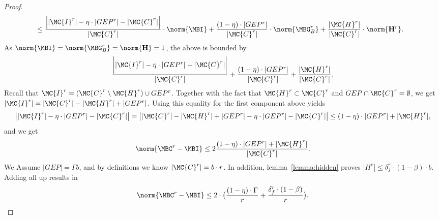 \begin{proof}
\begin{equation}
\begin{split}
& \leq \frac{\Big| |\MC{I}^r|-\eta\cdot |GEP^r|-|\MC{C}^r|\Big|}{|\MC{C}^r|}\cdot \norm{\MBI}+ \frac{(1-\eta)\cdot|GEP^r|}{|\MC{C}^r|}\cdot \norm{\MBG_B^r}+\frac{|\MC{H}^r|}{|\MC{C}^r|}\cdot \norm{\mathbf{H}^r}. 
\end{split}\end{equation}
As $\norm{\MBI}=\norm{\MBG^r_B}=\norm{\mathbf{H}}=1$, the above is bounded by 
$$ \frac{\bigg| |\MC{I}^r|-\eta\cdot |GEP^r|-|\MC{C}^r|\bigg|}{|\MC{C}^r|}+\frac{(1-\eta)\cdot|GEP^r|}{|\MC{C}^r|}+\frac{|\MC{H}^r|}{|\MC{C}^r|}.$$
Recall that $\MC{I}^r=(\MC{C}^r\setminus \MC{H}^r)\cup GEP^r$. Together with the fact that $\MC{H}^r\subset \MC{C}^r$ and $GEP\cap \MC{C}^r=\emptyset$, we get $|\MC{I}^r|=|\MC{C}^r|-|\MC{H}^r|+|GEP^r|$. Using this equality for the first component above yields 
$$\big| |\MC{I}^r|-\eta\cdot |GEP^r|-|\MC{C}^r|\big|=\big| |\MC{C}^r|-|\MC{H}^r|+|GEP^r|-\eta\cdot|GEP^r|-|\MC{C}^r|\big|\leq(1-\eta)\cdot |GEP^r|+|\MC{H}^r|,$$ 
and we get
$$\norm{\MBC^r-\MBI}\leq 2\frac{(1-\eta)\cdot|GEP^r|+|\MC{H}^r|}{|\MC{C}^r|}.$$
We Assume $|GEP|=\Gamma b$, and by definitions we know $|\MC{C}^r|=b\cdot r$. In addition, lemma~\ref{lemma:hidden} proves $|H^r|\leq \delta_f^r \cdot (1-\beta)\cdot b$. Adding all up results in
$$\norm{\MBC^r-\MBI}\leq 2\cdot\big(\frac{(1-\eta)\cdot\Gamma}{r}+\frac{\delta_f^r\cdot (1-\beta)}{r}\big).$$
\end{proof}




